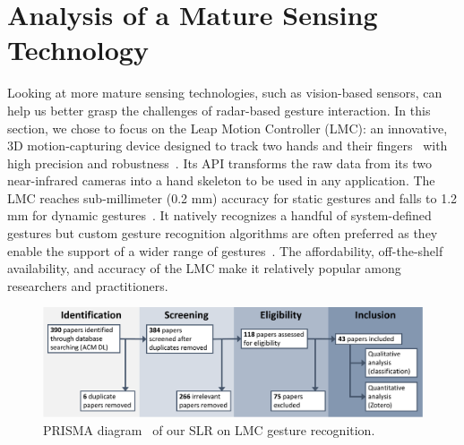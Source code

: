 \section{Analysis of a Mature Sensing Technology} \label{sec:state_of_the_art:lmc}
Looking at more mature sensing technologies, such as vision-based sensors, can help us better grasp the challenges of radar-based gesture interaction.
%
In this section, we chose to focus on the Leap Motion Controller (LMC): an innovative, 3D motion-capturing device designed to track two hands and their fingers~\cite{Togootogtokh:2018} with high precision and robustness~\cite{Weichert:2013}. Its API transforms the raw data from its two near-infrared cameras into a hand skeleton to be used in any application. The LMC reaches sub-millimeter (0.2 mm) accuracy for static gestures and falls to 1.2 mm for dynamic gestures~\cite{Weichert:2013}. It natively recognizes a handful of system-defined gestures but custom gesture recognition algorithms are often preferred as they enable the support of a wider range of gestures~\cite{Brandon:2014}.
The affordability, off-the-shelf availability, and accuracy of the LMC make it relatively popular among researchers and practitioners.

\begin{figure}[ht]
    \centering
    \includegraphics[width=\linewidth]{Figures/StateOfTheArt/LMC/PRISMA-LMC.pdf}
    \vspace{-18pt}
    \captionsetup{width=.9\linewidth}
    \caption{PRISMA diagram~\cite{Page:2021} of our SLR on LMC gesture recognition.}
    \label{fig:state_of_the_art:lmc:prisma}
\end{figure}

